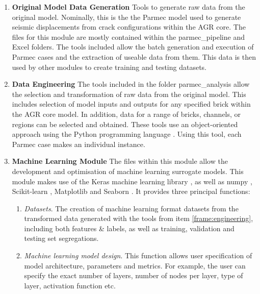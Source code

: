 \begin{enumerate}
	
	\item \textbf{Original Model Data Generation} Tools to generate raw data from the original model. Nominally, this is the the Parmec \cite{wiki:xxx} model used to generate seismic displacements from crack configurations within the AGR core. The files for this module are mostly contained within the parmec\_pipeline and Excel folders. The tools included allow the batch generation and execution of Parmec cases and the extraction of useable data from them. This data is then used by other modules to create training and testing datasets.
	
	\item \textbf{Data Engineering} \label{frame:engineering} The tools included in the folder parmec\_analysis allow the selection and transformation of raw data from the original model. This includes selection of model inputs and outputs for any specified brick within the AGR core model. In addition, data for a range of bricks, channels, or regions can be selected and obtained. These tools use an object-oriented approach using the Python programming language \cite{lutz2013learning}. Using this tool, each Parmec case makes an individual instance.
	
	
	\item \textbf{Machine Learning Module} The files within this module allow the development and optimisation of machine learning surrogate models. This module makes use of the Keras machine learning library \cite{ketkar2017introduction}, as well as numpy \cite{harris2020array}, Scikit-learn \cite{pedregosa2011scikit}, Matplotlib and Seaborn \cite{bisong2019matplotlib}. It provides three principal functions:  
	
	\begin{enumerate}[label=\roman*.]
		
		\item \textit{Datasets}. The creation of machine learning format datasets from the transformed data generated with the tools from item \ref{frame:engineering}, including both features \& labels, as well as training, validation and testing set segregations.
		
		\item \textit{Machine learning model design}. This function allows user specification of model architecture, parameters and metrics. For example, the user can specify the exact number of layers, number of nodes per layer, type of layer, activation function etc. 
		

\end{enumerate}
\end{enumerate}
